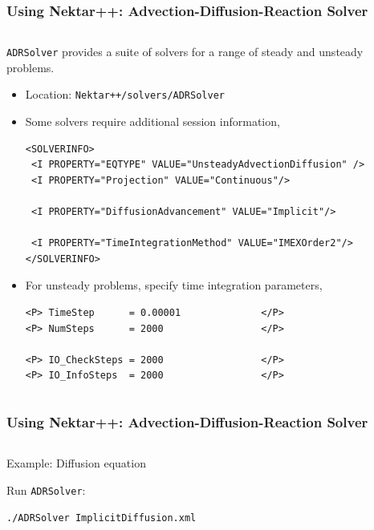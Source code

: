 \documentclass{beamer}
\numberwithin{figure}{section}
\numberwithin{equation}{section}
\begin{document}

\begin{frame}[fragile]
\frametitle{Using Nektar++: Advection-Diffusion-Reaction Solver}
\begin{minipage}[c][0.8\textheight][t]{\linewidth}
\begin{columns}
\begin{column}[l]{11.5cm}
\texttt{ADRSolver} provides a suite of solvers for a range of steady and
unsteady problems.
\begin{itemize}
  \item Location: \texttt{Nektar++/solvers/ADRSolver}
  \item Some solvers require additional session information,
  \begin{lstlisting}
<SOLVERINFO>
 <I PROPERTY="EQTYPE" VALUE="UnsteadyAdvectionDiffusion" />
 <I PROPERTY="Projection" VALUE="Continuous"/>
 
 <I PROPERTY="DiffusionAdvancement" VALUE="Implicit"/>
 
 <I PROPERTY="TimeIntegrationMethod" VALUE="IMEXOrder2"/>
</SOLVERINFO>
  \end{lstlisting}
  \item For unsteady problems, specify time integration parameters,
  \begin{lstlisting}
<P> TimeStep      = 0.00001              </P>
<P> NumSteps      = 2000                 </P>

<P> IO_CheckSteps = 2000                 </P>
<P> IO_InfoSteps  = 2000                 </P>
  \end{lstlisting}
\end{itemize}
\end{column}
\end{columns}
\end{minipage}
\end{frame}


\begin{frame}[fragile]
\frametitle{Using Nektar++: Advection-Diffusion-Reaction Solver}
\begin{minipage}[c][0.8\textheight][t]{\linewidth}
\begin{columns}
\begin{column}[l]{11.5cm}
Example: Diffusion equation

\bigskip
Run \texttt{ADRSolver}:
\begin{verbatim}
./ADRSolver ImplicitDiffusion.xml
\end{verbatim}
\end{column}
\end{columns}
\end{minipage}
\end{frame}
\end{document}
